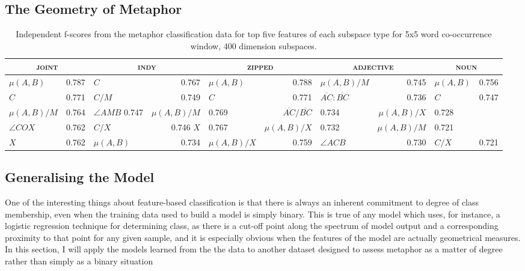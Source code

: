 \subsection{The Geometry of Metaphor}
\begin{table}
\centering
\begin{tabular}{lr|lr|lr|lr|lr}
\hline
\multicolumn{2}{c}{\textsc{joint}} & \multicolumn{2}{c}{\textsc{indy}} & \multicolumn{2}{c}{\textsc{zipped}} & \multicolumn{2}{c}{\textsc{adjective}} & \multicolumn{2}{c}{\textsc{noun}} \\
\hline
$\mu(A,B)$ & 0.787 & $C$ & 0.767 & $\mu(A,B)$ & 0.788 & $\mu(A,B)/M$ & 0.745 & $\mu(A,B)$ & 0.756 \\
$C$ & 0.771 & $C/M$ & 0.749 & $C$ & 0.771 & $\overline{AC}:\overline{BC}$ & 0.736 & $C$ & 0.747 \\
$\mu(A,B)/M$ & 0.764 & $\angle AMB$ 0.747 & $\mu(A,B)/M$ & 0.769 & $\overline{AC}/\overline{BC}$ & 0.734 & $\mu(A,B)/X$ & 0.728 \\
$\angle COX$ & 0.762 & $C/X$ & 0.746 $X$ & 0.767 & $\mu(A,B)/X$ & 0.732 & $\mu(A,B)/M$ & 0.721 \\
$X$ & 0.762 & $\mu(A,B)$ & 0.734 & $\mu(A,B)/X$ & 0.759 & $\angle ACB$ & 0.730 & $C/X$ & 0.721 \\
\hline
\end{tabular}
\caption{Independent f-scores from the metaphor classification data for top five features of each subspace type for 5x5 word co-occurrence window, 400 dimension subspaces.}
\label{tab:ind-metaphor}
\end{table}

\subsection{Generalising the Model} \label{sec:genaphor}
One of the interesting things about feature-based classification is that there is always an inherent commitment to degree of class membership, even when the training data used to build a model is simply binary.  This is true of any model which uses, for instance, a logistic regression technique for determining class, as there is a cut-off point along the spectrum of model output and a corresponding proximity to that point for any given sample, and it is especially obvious when the features of the model are actually geometrical measures.  In this section, I will apply the models learned from the the \cite{GutierrezEA2016} data to another dataset designed to assess metaphor as a matter of degree rather than simply as a binary situation

